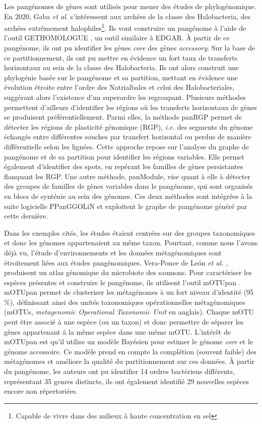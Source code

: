 Les pangénomes de gènes sont utilisés pour mener des études de phylogénomique. En 2020, Gaba \textit{et al.} \cite{gaba_pan-genome_2020} s'intéressent aux archées de la classe des Halobacteria, des archées extrêmement halophiles\footnote{Capable de vivre dans des milieux à haute concentration en sel}. Ils vont construire un pangénome à l'aide de l'outil GET\textunderscore HOMOLOGUE \cite{contreras-moreira_get_homologues_2013}, un outil similaire à EDGAR. À partir de ce pangénome, ils ont pu identifier les gènes \textit{core} des gènes \textit{accessory}. Sur la base de ce partitionnement, ils ont pu mettre en évidence un fort taux de transferts horizontaux au sein de la classe des Halobacteria. Ils ont alors construit une phylogénie basée sur le pangénome et sa partition, mettant en évidence une évolution étroite entre l'ordre des Natrialbales et celui des Halobacteriales, suggérant alors l'existence d'un superordre les regroupant. Plusieurs méthodes permettent d’ailleurs d'identifier les régions où les transferts horizontaux de gènes se produisent préférentiellement. Parmi elles, la méthode panRGP\cite{bazin_panrgp_2020} permet de détecter les régions de plasticité génomique (RGP), \textit{i.e.} des segments du génome échangés entre différentes souches par transfert horizontal ou perdus de manière différentielle selon les lignées. Cette approche repose sur l’analyse du graphe de pangénome et de sa partition pour identifier les régions variables. Elle permet également d’identifier des spots, en repérant les familles de gènes persistantes flanquant les RGP. Une autre méthode, panModule\cite{bazin_panmodule_2021}, vise quant à elle à détecter des groupes de familles de gènes variables dans le pangénome, qui sont organisés en blocs de synténie au sein des génomes. Ces deux méthodes sont intégrées à la suite logicielle PPanGGOLiN et exploitent le graphe de pangénome généré par cette dernière.

Dans les exemples cités, les études étaient centrées sur des groupes taxonomiques et donc les génomes appartenaient au même taxon. Pourtant, comme nous l'avons déjà vu, l'étude d'environnements et les données métagénomiques sont étroitement liées aux études pangénomiques. Vera-Ponce de León \textit{et al.} \cite{vera-ponce_de_leon_genomic_2024}, produisent un atlas génomique du microbiote des saumons. Pour caractériser les espèces présentes et construire le pangénome, ils utilisent l'outil mOTUpan \cite{buck_motupan_2022}. mOTUpan permet de clusteriser les métagénomes à un fort niveau d'identité (95 \%), définissant ainsi des unités taxonomiques opérationnelles métagénomiques (mOTUs, \textit{metagenomic Operational Taxonomic Unit} en anglais). Chaque mOTU peut être associé à une espèce (ou un taxon) et donc permettre de séparer les gènes appartenant à la même espèce dans une même mOTU. L'intérêt de mOTUpan est qu'il utilise un modèle Bayésien pour estimer le génome \textit{core} et le génome accessoire. Ce modèle prend en compte la complétion (souvent faible) des métagénomes et améliore la qualité du partitionnement sur ces données. À partir du pangénome, les auteurs ont pu identifier 14 ordres bactériens différents, représentant 35 genres distincts, ils ont également identifié 29 nouvelles espèces encore non répertoriées.

